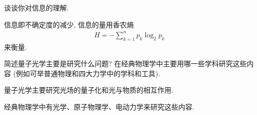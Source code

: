 \documentclass{assignment}
\begin{document}
\begin{prob}[附加题]
    谈谈你对信息的理解.
\end{prob}
\begin{sol}
    信息即不确定度的减少, 信息的量用香农熵
    \begin{align}
        H=-\sum_{k=1}^np_k\log_2p_k
    \end{align}
    来衡量.
\end{sol}

\begin{prob}[附加题]
    简述量子光学主要是研究什么问题? 在经典物理学中主要用哪一些学科研究这些内容 (例如可举普通物理和四大力学中的学科和工具).
\end{prob}
\begin{sol}
    量子光学主要研究光场的量子化和光与物质的相互作用.

    经典物理学中有光学、原子物理学、电动力学来研究这些内容.
\end{sol}
\end{document}
